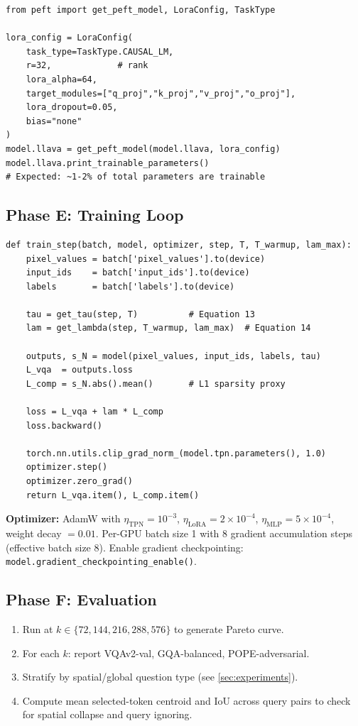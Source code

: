 \documentclass[12pt,a4paper]{article}
\begin{document}
\begin{lstlisting}[caption={LoRA setup via PEFT library.}]
from peft import get_peft_model, LoraConfig, TaskType

lora_config = LoraConfig(
    task_type=TaskType.CAUSAL_LM,
    r=32,             # rank
    lora_alpha=64,
    target_modules=["q_proj","k_proj","v_proj","o_proj"],
    lora_dropout=0.05,
    bias="none"
)
model.llava = get_peft_model(model.llava, lora_config)
model.llava.print_trainable_parameters()
# Expected: ~1-2% of total parameters are trainable
\end{lstlisting}

\subsection{Phase E: Training Loop}

\begin{lstlisting}[caption={Core training step.}]
def train_step(batch, model, optimizer, step, T, T_warmup, lam_max):
    pixel_values = batch['pixel_values'].to(device)
    input_ids    = batch['input_ids'].to(device)
    labels       = batch['labels'].to(device)

    tau = get_tau(step, T)          # Equation 13
    lam = get_lambda(step, T_warmup, lam_max)  # Equation 14

    outputs, s_N = model(pixel_values, input_ids, labels, tau)
    L_vqa  = outputs.loss
    L_comp = s_N.abs().mean()       # L1 sparsity proxy

    loss = L_vqa + lam * L_comp
    loss.backward()

    torch.nn.utils.clip_grad_norm_(model.tpn.parameters(), 1.0)
    optimizer.step()
    optimizer.zero_grad()
    return L_vqa.item(), L_comp.item()
\end{lstlisting}

\textbf{Optimizer:} AdamW with $\eta_{\mathrm{TPN}} = 10^{-3}$,
$\eta_{\mathrm{LoRA}} = 2 \times 10^{-4}$, $\eta_{\mathrm{MLP}} = 5 \times
10^{-4}$, weight decay $= 0.01$.
Per-GPU batch size 1 with 8 gradient accumulation steps (effective batch size 8).
Enable gradient checkpointing: \texttt{model.gradient\_checkpointing\_enable()}.

\subsection{Phase F: Evaluation}

\begin{enumerate}[leftmargin=2em]
  \item Run at $k \in \{72, 144, 216, 288, 576\}$ to generate Pareto curve.
  \item For each $k$: report VQAv2-val, GQA-balanced, POPE-adversarial.
  \item Stratify by spatial/global question type (see \cref{sec:experiments}).
  \item Compute mean selected-token centroid and IoU across query pairs to
    check for spatial collapse and query ignoring.
\end{enumerate}
\end{document}

